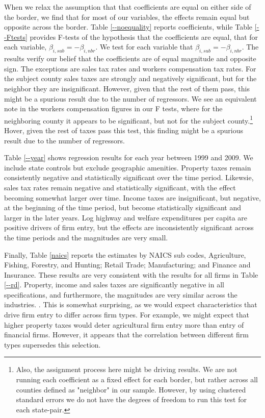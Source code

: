 When we relax the assumption that  that coefficients are equal on either side of the border, we find that for most of our variables, the effects remain equal but opposite across the border. Table \ref{--noequality} reports coefficients, while Table \ref{--Ftests} provides F-tests of the hypothesis that the coefficients are equal, that for each variable, $\beta_{i,sub} = - \beta_{i,nbr}$. We test for each variable that $\beta_{i,sub} = - \beta_{i,nbr}$. The results verify our belief that the coefficients are of equal magnitude and opposite sign. The exceptions are sales tax rates and workers compensation tax rates. For the subject county sales taxes are strongly and negatively significant, but for the neighbor they are insignificant. However, given that the rest of them pass, this might be a spurious result due to the number of regressors. We see an equivalent note in the workers compensation figures in our F tests, where for the neighboring county it appears to be significant, but not for the subject county.\footnote{Also, the assignment process here might be driving results. We are not running each coefficient as a fixed effect for each border, but rather across all counties defined as "neighbor" in our sample. However, by using clustered standard errors we do not have the degrees of freedom to run this test for each state-pair.} Hover, given the rest of taxes pass this test, this finding might be a spurious result due to the number of regressors.

Table \ref{--year} shows regression results for each  year between 1999 and 2009. We include state controls but exclude geographic amenities. Property taxes remain consistently negative and statistically significant over the time period. Likewsie, sales tax rates remain negative and statistically significant, with the effect becoming somewhat larger over time.  Income taxes are insignificant, but negative, at the beginning of the time period, but  become statistically significant and larger in the later years. Log highway and welfare expenditures per capita are positive drivers of firm entry, but the effects are inconsistently significant across the time periods and the magnitudes are very small.

Finally, Table \ref{naics} reports the estimates by NAICS sub codes,  Agriculture, Fishing, Forestry, and Hunting; Retail Trade; Manufacturing; and Finance and Insurance. These results are very consistent with the results for all firms in Table \ref{--rd}. Property, income and sales taxes are significantly negative in all specifications, and furthermore, the magnitudes are very similar across the industries. . This is somewhat surprising, as we would expect characteristics that drive firm entry to differ across firm types. For example, we might expect that higher property taxes would deter agricultural firm entry more than entry of financial firms.  However, it appears that the correlation between different firm types supersedes this selection. 

